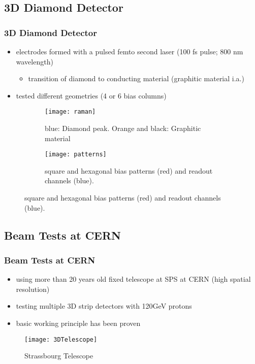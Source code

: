 \subsection{3D Diamond Detector}
\begin{frame}
	\frametitle{3D Diamond Detector}
	\begin{itemize}
		\item electrodes formed with a pulsed femto second laser (100 fs pulse; 800 nm wavelength)
		\begin{itemize}
			\item transition of diamond to conducting material (graphitic material i.a.)
		\end{itemize}
		\item tested different geometries (4 or 6 bias columns)
    \end{itemize}
	\begin{figure}
		\centering
		\begin{subfigure}[t]{0.45\textwidth}
			\centering
			\texttt{[image: raman]}
			\caption{blue: Diamond peak. Orange and black: Graphitic material}
		\end{subfigure}
		\begin{subfigure}[t]{0.45\textwidth}
			\centering
			\texttt{[image: patterns]}
			\caption{square and hexagonal bias patterns (red) and readout channels (blue).}
		\end{subfigure}
	\end{figure}
\end{frame}

\subsection{Beam Tests at CERN}
\begin{frame}
	\frametitle{Beam Tests at CERN}
	\begin{itemize}
		\setlength{\itemsep}{\fill}
		\item using more than 20 years old fixed telescope at SPS at CERN (high spatial resolution)
		\item testing multiple 3D strip detectors with 120GeV protons
		\item basic working principle has been proven
	\end{itemize}
	\begin{figure}
		\centering
		\texttt{[image: 3DTelescope]}
		\caption{Strassbourg Telescope}
	\end{figure}
\end{frame}
